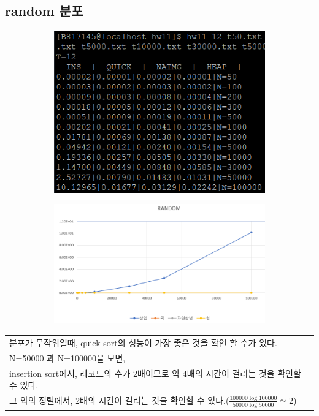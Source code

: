 \documentclass{article}
\begin{document}
\subsection{random 분포}
\begin{figure}[H]
\begin{subfigure}[ht]{.3\linewidth}\centering
\includegraphics[width=.9\linewidth]{random2.PNG}
\end{subfigure}
\begin{subfigure}[ht]{.7\linewidth}\centering
\includegraphics[width=.9\linewidth]{random.PNG}
\end{subfigure}
\end{figure}
\begin{table}[H]
\centering
\begin{tabular}{|m{15cm}|}
\hline
분포가 무작위일때, quick sort의 성능이 가장 좋은 것을 확인 할 수가 있다.\\
N=50000 과 N=100000을 보면, \\
insertion sort에서, 레코드의 수가 2배이므로 약 4배의 시간이 걸리는 것을 확인할 수 있다.\\
그 외의 정렬에서, 2배의 시간이 걸리는 것을 확인할 수 있다.($\frac{100000\log 100000}{50000\log 50000}\simeq 2$) \\
\hline
\end{tabular}
\end{table}
\end{document}
